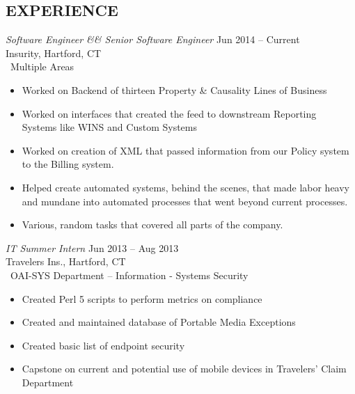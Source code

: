 \documentclass[margin]{res}
\begin{document}
\begin{resume}
   \section{EXPERIENCE} 
   {\sl Software Engineer \&\& Senior Software Engineer} \hfill Jun 2014 -- Current \\
   Insurity, Hartford, CT\\\
   Multiple Areas
   \begin{itemize}  %
      \item Worked on Backend of thirteen Property \& Causality Lines of Business
      \item Worked on interfaces that created the feed to downstream Reporting \\
         Systems like WINS and Custom Systems
      \item Worked on creation of XML that passed information from our Policy system \\
         to the Billing system.
      \item Helped create automated systems, behind the scenes, that made labor heavy \\
         and mundane into automated processes that went beyond current processes.
      \item Various, random tasks that covered all parts of the company.
   \end{itemize}

   {\sl IT Summer Intern} \hfill Jun 2013 -- Aug 2013 \\
   Travelers Ins., Hartford, CT\\\
   OAI-SYS Department -- Information - Systems Security
   \begin{itemize}  %
      \item Created Perl 5 scripts to perform metrics on
         compliance
      \item Created and maintained database of Portable
         Media Exceptions
      \item Created basic list of endpoint security
      \item Capstone on current and potential use of mobile
         devices in Travelers' Claim Department
   \end{itemize}


\end{resume}
\end{document}
